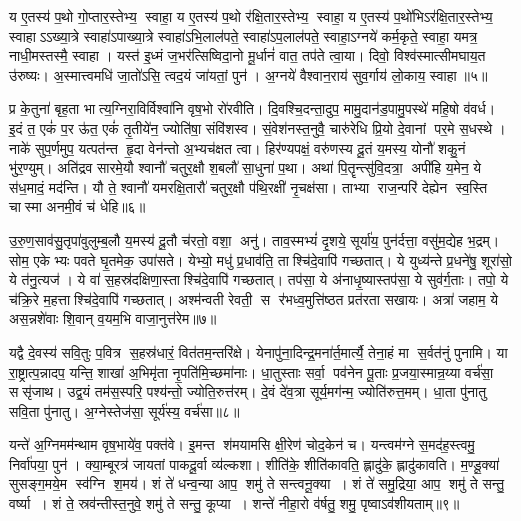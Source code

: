 य ए॒तस्य॑ प॒थो गो॒प्तार॒स्तेभ्य॒ स्वाहा॒ य ए॒तस्य॑ प॒थो र॑क्षि॒तार॒स्तेभ्य॒ स्वाहा॒ य ए॒तस्य॑ प॒थो॑भिऽर॑क्षि॒तार॒स्तेभ्य॒ स्वाहाऽऽख्या॒त्रे स्वाहा॑ऽपाख्या॒त्रे स्वाहा॑ऽभि॒लाल॑पते॒ स्वाहा॑ऽप॒लाल॑पते॒ स्वाहा॒ऽग्नये॑ कर्म॒कृते॒ स्वाहा॒ यमत्र॒ नाधी॒मस्तस्मै॒ स्वाहा। यस्त॑ इ॒ध्मं ज॒भर॑त्सिष्विदा॒नो मू॒र्धानं॑ वात॒ तप॑ते त्वा॒या। दिवो॒ विश्व॑स्मात्सीमघाय॒त उ॑रुष्यः। अ॒स्मात्त्वमधि॑ जा॒तो॑ऽसि॒ त्वद॒यं जा॑यतां॒ पुन॑। अ॒ग्नये॑ वैश्वान॒राय॑ सुव॒र्गाय॑ लो॒काय॒ स्वाहा॥५॥
\anuvakamend[य ए॒तस्य॒ त्वत्पञ्च॑]

प्र के॒तुना॑ बृह॒ता भात्य॒ग्निरा॒विर्विश्वा॑नि वृष॒भो रो॑रवीति। दि॒वश्चि॒दन्ता॒दुप॒ मामु॒दान॑ड॒पामु॒पस्थे॑ महि॒षो व॑वर्ध। इ॒दं त॒ एकं॑ प॒र ऊ॑त॒ एकं॑ तृ॒तीये॑न॒ ज्योति॑षा॒ संवि॑शस्व। सं॒वेश॑नस्त॒नुवै॒ चारु॑रेधि प्रि॒यो दे॒वानां पर॒मे स॒धस्थे। नाके॑ सुप॒र्णमुप॒ यत्पत॑न्त हृ॒दा वेन॑न्तो अ॒भ्यच॑क्षत त्वा। हिर॑ण्यपक्षं॒ वरु॑णस्य दू॒तं य॒मस्य॒ योनौ॑ शकु॒नं भु॑र॒ण्युम्। अति॑द्रव सारमे॒यौ श्वानौ॑ चतुर॒क्षौ श॒बलौ॑ सा॒धुना॑ प॒था। अथा॑ पि॒तॄन्त्सु॑वि॒दत्रा॒ अपी॑हि य॒मेन॒ ये स॑ध॒मादं॒ मद॑न्ति। यौ ते॒ श्वानौ॑ यमरक्षि॒तारौ॑ चतुर॒क्षौ प॑थि॒रक्षी॑ नृ॒चक्ष॑सा। ताभ्या राज॒न्परि॑ देह्येन स्व॒स्ति चास्मा अनमी॒वं च॑ धेहि॥६॥

उ॒रु॒ण॒साव॑सु॒तृपा॑वुलुम्ब॒लौ य॒मस्य॑ दू॒तौ च॑रतो॒ वशा॒ अनु॑। ताव॒स्मभ्यं॑ दृ॒शये॒ सूर्या॑य॒ पुन॑र्दत्ता॒ वसु॑म॒द्येह भ॒द्रम्। सोम॒ एकेभ्यः पवते घृ॒तमेक॒ उपा॑सते। येभ्यो॒ मधु॑ प्र॒धाव॑ति॒ ताश्चि॑दे॒वापि॑ गच्छतात्। ये युध्य॑न्ते प्र॒धने॑षु॒ शूरा॑सो॒ ये त॑नु॒त्यज॑। ये वा॑ स॒हस्र॑दक्षिणा॒स्ताश्चि॑दे॒वापि॑ गच्छतात्। तप॑सा॒ ये अ॑नाधृ॒ष्यास्तप॑सा॒ ये सुव॑र्ग॒ताः। तपो॒ ये च॑क्रि॒रे म॒हत्ताश्चि॑दे॒वापि॑ गच्छतात्। अश्म॑न्वती रेवती॒ स र॑भध्व॒मुत्ति॑ष्ठत प्रत॑रता सखायः। अत्रा॑ जहाम॒ ये अस॒न्नशे॑वाः  शि॒वान् व॒यम॒भि वाजा॒नुत्त॑रेम॥७॥

यद्वै दे॒वस्य॑ सवि॒तुः प॒वित्र स॒हस्र॑धारं॒  वित॑तम॒न्तरि॑क्षे। येनापु॑ना॒दिन्द्र॒मना॑र्त॒मार्त्यै॒ तेना॒हं मा स॒र्वत॑नुं पुनामि। या रा॒ष्ट्रात्प॒न्नादप॒ यन्ति॒ शाखा॑ अ॒भिमृ॑ता नृ॒पति॑मि॒च्छमा॑नाः। धा॒तुस्ताः सर्वा॒ पव॑नेन पू॒ताः प्र॒जया॒स्मान्र॒य्या वर्च॑सा॒ ससृ॑जाथ। उद्व॒यं तम॑स॒स्परि॒ पश्य॑न्तो॒ ज्योति॒रुत्त॑रम्। दे॒वं दे॑व॒त्रा सूर्य॒मग॑न्म॒ ज्योति॑रुत्त॒मम्। धा॒ता पु॑नातु सवि॒ता पु॑नातु। अ॒ग्नेस्तेज॑सा॒ सूर्य॑स्य॒ वर्च॑सा॥८॥
\anuvakamend[धे॒ह्युत्त॑रेमा॒ष्टौ च॑]

यन्ते॑ अ॒ग्निमम॑न्थाम वृष॒भाये॑व॒ पक्त॑वे। इ॒मन्त श॑मयामसि क्षी॒रेण॑ चोद॒केन॑ च। यन्त्वम॑ग्ने स॒मद॑ह॒स्त्वमु॒ निर्वा॑पया॒ पुन॑। क्या॒म्बूरत्र॑ जायतां पाकदू॒र्वा व्य॑ल्कशा। शीति॑के॒ शीति॑कावति॒ ह्लादु॑के॒ ह्लादु॑कावति। म॒ण्डू॒क्या॑ सुसङ्ग॒मये॒म स्व॑ग्नि श॒मय॑। शं ते॑ धन्व॒न्या आप॒ शमु॑ ते सन्त्वनू॒क्या। शं ते॑ समु॒द्रिया॒ आप॒ शमु॑ ते सन्तु॒ वर्ष्या। शं ते॒ स्रव॑न्तीस्त॒नुवे॒ शमु॑ ते सन्तु॒ कूप्या। शन्ते॑ नीहा॒रो व॑र्\mbox{}षतु॒ शमु॒ पृष्वाऽव॑शीयताम्॥९॥

